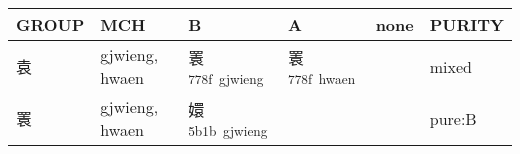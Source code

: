 \documentclass[14pt,a4paper]{scrartcl}
\begin{document}
\begin{longtable}[c]{@{}llllll@{}}
\toprule
\begin{minipage}[b]{0.14\columnwidth}\raggedright\strut
GROUP
\strut\end{minipage} &
\begin{minipage}[b]{0.14\columnwidth}\raggedright\strut
MCH
\strut\end{minipage} &
\begin{minipage}[b]{0.14\columnwidth}\raggedright\strut
B
\strut\end{minipage} &
\begin{minipage}[b]{0.14\columnwidth}\raggedright\strut
A
\strut\end{minipage} &
\begin{minipage}[b]{0.14\columnwidth}\raggedright\strut
none
\strut\end{minipage} &
\begin{minipage}[b]{0.14\columnwidth}\raggedright\strut
PURITY
\strut\end{minipage}\tabularnewline
\midrule
\endhead
\begin{minipage}[t]{0.14\columnwidth}\raggedright\strut
袁
\strut\end{minipage} &
\begin{minipage}[t]{0.14\columnwidth}\raggedright\strut
gjwieng, hwaen
\strut\end{minipage} &
\begin{minipage}[t]{0.14\columnwidth}\raggedright\strut
瞏\textsuperscript{778f~gjwieng}
\strut\end{minipage} &
\begin{minipage}[t]{0.14\columnwidth}\raggedright\strut
瞏\textsuperscript{778f~hwaen}
\strut\end{minipage} &
\begin{minipage}[t]{0.14\columnwidth}\raggedright\strut
\strut\end{minipage} &
\begin{minipage}[t]{0.14\columnwidth}\raggedright\strut
mixed
\strut\end{minipage}\tabularnewline
\begin{minipage}[t]{0.14\columnwidth}\raggedright\strut
瞏
\strut\end{minipage} &
\begin{minipage}[t]{0.14\columnwidth}\raggedright\strut
gjwieng, hwaen
\strut\end{minipage} &
\begin{minipage}[t]{0.14\columnwidth}\raggedright\strut
嬛\textsuperscript{5b1b~gjwieng}
\strut\end{minipage} &
\begin{minipage}[t]{0.14\columnwidth}\raggedright\strut
\strut\end{minipage} &
\begin{minipage}[t]{0.14\columnwidth}\raggedright\strut
\strut\end{minipage} &
\begin{minipage}[t]{0.14\columnwidth}\raggedright\strut
pure:B
\strut\end{minipage}\tabularnewline
\bottomrule
\end{longtable}
\end{document}
